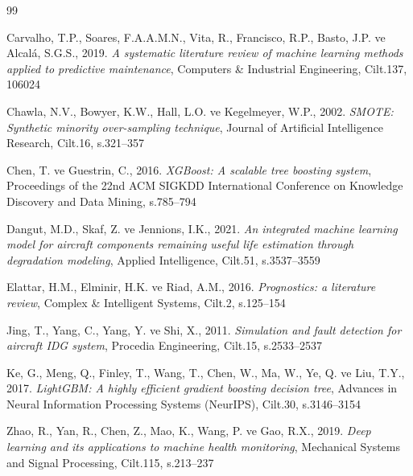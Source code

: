\documentclass[11pt]{article}
\begin{document}
\begin{thebibliography}{99}

   Carvalho, T.P., Soares, F.A.A.M.N., Vita, R., Francisco, R.P., Basto, J.P. ve Alcalá, S.G.S., 2019.
   {\it A systematic literature review of machine learning methods applied to predictive maintenance},
   Computers \& Industrial Engineering, Cilt.137, 106024

   Chawla, N.V., Bowyer, K.W., Hall, L.O. ve Kegelmeyer, W.P., 2002.
   {\it SMOTE: Synthetic minority over-sampling technique},
   Journal of Artificial Intelligence Research, Cilt.16, s.321--357

   Chen, T. ve Guestrin, C., 2016.
   {\it XGBoost: A scalable tree boosting system},
   Proceedings of the 22nd ACM SIGKDD International Conference on Knowledge Discovery and Data Mining, s.785--794

   Dangut, M.D., Skaf, Z. ve Jennions, I.K., 2021.
   {\it An integrated machine learning model for aircraft components remaining useful life estimation through degradation modeling},
   Applied Intelligence, Cilt.51, s.3537--3559

   Elattar, H.M., Elminir, H.K. ve Riad, A.M., 2016.
   {\it Prognostics: a literature review},
   Complex \& Intelligent Systems, Cilt.2, s.125--154

   Jing, T., Yang, C., Yang, Y. ve Shi, X., 2011.
   {\it Simulation and fault detection for aircraft IDG system},
   Procedia Engineering, Cilt.15, s.2533--2537

   Ke, G., Meng, Q., Finley, T., Wang, T., Chen, W., Ma, W., Ye, Q. ve Liu, T.Y., 2017.
   {\it LightGBM: A highly efficient gradient boosting decision tree},
   Advances in Neural Information Processing Systems (NeurIPS), Cilt.30, s.3146--3154

   Zhao, R., Yan, R., Chen, Z., Mao, K., Wang, P. ve Gao, R.X., 2019.
   {\it Deep learning and its applications to machine health monitoring},
   Mechanical Systems and Signal Processing, Cilt.115, s.213--237

\end{thebibliography}
\end{document}
